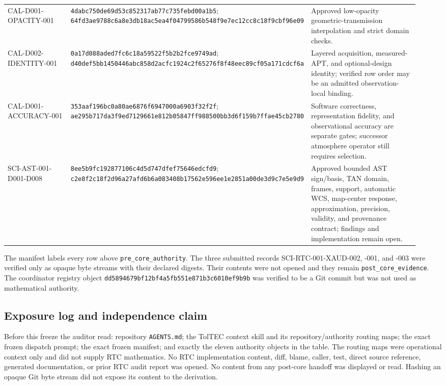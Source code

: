\documentclass[11pt]{article}
\newcommand{\code}[1]{\nolinkurl{#1}}
\begin{document}
\begin{longtable}{@{}p{0.20\linewidth}p{0.27\linewidth}p{0.47\linewidth}@{}}
CAL-D001-OPACITY-001 &
\code{4dabc750de69d53c852317ab77c735febd00a1b5};
\code{64fd3ae9788c6a8e3db18ac5ea4f04799586b548f9e7ec12cc8c18f9cbf96e09} &
Approved low-opacity geometric-transmission interpolation and strict domain
checks. \\
CAL-D002-IDENTITY-001 &
\code{0a17d088aded7fc6c18a59522f5b2b2fce9749ad};
\code{d40def5bb1450446abc858d2acfc1924c2f65276f8f48eec89cf05a171cdcf6a} &
Layered acquisition, measured-APT, and optional-design identity; verified row
order may be an admitted observation-local binding. \\
CAL-D001-ACCURACY-001 &
\code{353aaf196bc0a80ae6876f6947000a6903f32f2f};
\code{ae295b717da3f9ed7129661e812b05847ff988500bb3d6f159b7ffae45cb2780} &
Software correctness, representation fidelity, and observational accuracy are
separate gates; successor atmosphere operator still requires selection. \\
SCI-AST-001-D001-D008 &
\code{8ee5b9fc192877106c4d5d747dfef75646edcfd9};
\code{c2e8f2c18f2d96a27afd6b6a083408b17562e596ee1e2851a00de3d9c7e5e9d9} &
Approved bounded AST sign/basis, TAN domain, frames, support, automatic WCS,
map-center response, approximation, precision, validity, and provenance
contract; findings and implementation remain open. \\
\bottomrule
\end{longtable}

The manifest labels every row above \code{pre_core_authority}.  The three
submitted records SCI-RTC-001-XAUD-002, -001, and -003 were verified only as
opaque byte streams with their declared digests.  Their contents were not
opened and they remain \code{post_core_evidence}.  The coordinator registry
object \code{dd5894679bf12bf4a5fb551e871b3c6010ef9b9b} was verified to be a Git
commit but was not used as mathematical authority.

\subsection{Exposure log and independence claim}

Before this freeze the auditor read: repository \code{AGENTS.md}; the TolTEC
context skill and its repository/authority routing maps; the exact frozen
dispatch prompt; the exact frozen manifest; and exactly the eleven authority
objects in the table.  The routing maps were operational context only and did
not supply RTC mathematics.  No RTC implementation content, diff, blame,
caller, test, direct source reference, generated documentation, or prior RTC
audit report was opened.  No content from any post-core handoff was displayed
or read.  Hashing an opaque Git byte stream did not expose its content to the
derivation.
\end{document}
